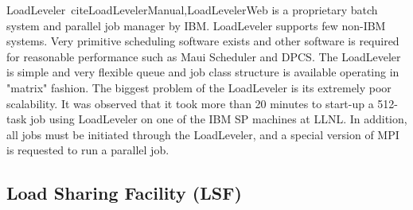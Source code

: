 LoadLeveler~cite{LoadLevelerManual,LoadLevelerWeb} 
is a proprietary batch system and parallel job manager by 
IBM. LoadLeveler supports few non-IBM systems. Very primitive 
scheduling software exists and other software is required for reasonable 
performance such as Maui Scheduler and DPCS. 
The LoadLeveler is simple and very flexible queue and job class structure is available 
operating in "matrix" fashion. 
The biggest problem of the LoadLeveler is its extremely poor scalability. It was observed that 
it took more than 20 minutes to start-up a 512-task job using LoadLeveler on one of
the IBM SP machines at LLNL.
In addition, all jobs must be initiated through the LoadLeveler, and a special version of
MPI is requested to run a parallel job.
%
%
%
\subsection*{Load Sharing Facility (LSF)}

